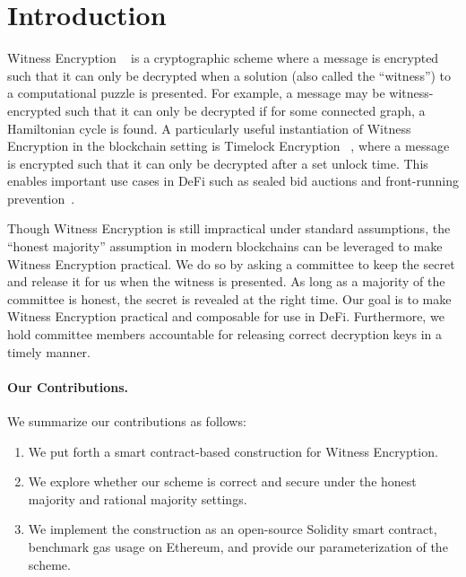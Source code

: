 \section{Introduction}


Witness Encryption ~\cite{witness_encryption} is a cryptographic scheme where a message is encrypted such that it can only be decrypted when a solution (also called the ``witness'') to a computational puzzle is presented.
For example, a message may be witness-encrypted such that it can only be decrypted if for some connected graph, a Hamiltonian cycle is found.
A particularly useful instantiation of Witness Encryption in the blockchain setting is Timelock Encryption ~\cite{timelock_puzzles,timelock_from_crc,timed_release_cryptography}, where a message is encrypted such that it can only be decrypted after a set unlock time.
This enables important use cases in DeFi such as sealed bid auctions and front-running prevention~\cite{i-TiRE}.

Though Witness Encryption is still impractical under standard assumptions, the ``honest majority'' assumption in modern blockchains can be leveraged to make Witness Encryption practical.
We do so by asking a committee to keep the secret and release it for us when the witness is presented.
As long as a majority of the committee is honest, the secret is revealed at the right time.
Our goal is to make Witness Encryption practical and composable for use in DeFi.
Furthermore, we hold committee members accountable for releasing correct decryption keys in a timely manner.

\paragraph{Our Contributions.} We summarize our contributions as follows:
\begin{enumerate}
    \item We put forth a smart contract-based construction for Witness Encryption.
    \item We explore whether our scheme is correct and secure under the honest majority and rational majority settings.
    \item We implement the construction as an open-source Solidity smart contract, benchmark gas usage on Ethereum, and provide our parameterization of the scheme.
\end{enumerate}

